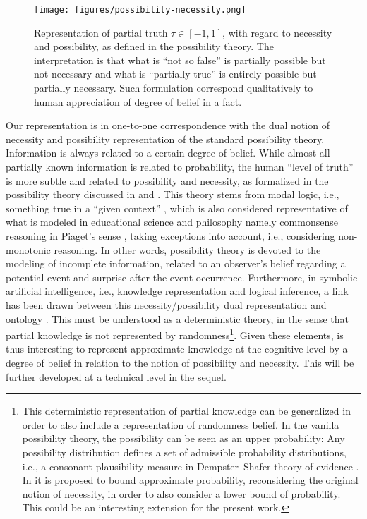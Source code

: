 \documentclass[sn-mathphys]{sn-jnl}
\begin{document}
\begin{figure}[htbp]
\centerline{\texttt{[image: figures/possibility-necessity.png]}}
\caption{Representation of partial truth $\tau \in [-1,1]$, with regard to necessity and possibility, as defined in the possibility theory. The interpretation is that what is ``not so false'' is partially possible but not necessary and what is ``partially true'' is entirely possible but partially necessary. Such formulation correspond qualitatively to human appreciation of degree of belief in a fact.}
\label{possibility-necessity}
\end{figure}

Our representation is in one-to-one correspondence with the dual notion of necessity and possibility representation of the standard possibility theory. Information is always related to a certain degree of belief. While almost all partially known information is related to probability, the human ``level of truth'' is more subtle and related to possibility and necessity, as formalized in the possibility theory discussed in \cite{denoeux_representations_2020} and \cite{denoeux_representations_2020-1}. This theory stems from modal logic, i.e., something true in a ``given context'' \cite{fischer_modal_2018}, which is also considered representative of what is modeled in educational science and philosophy \cite{rusawuk_possibility_2018} namely commonsense reasoning in Piaget's sense \cite{smith_development_1994}, taking exceptions into account, i.e., considering non-monotonic reasoning. In other words, possibility theory is devoted to the modeling of incomplete information, related to an observer's belief regarding a potential event and surprise after the event occurrence. Furthermore, in symbolic artificial intelligence, i.e., knowledge representation and logical inference, a link has been drawn between this necessity/possibility dual representation and ontology \cite{tettamanzi_possibilistic_2017}. This must be understood as a deterministic theory, in the sense that partial knowledge is not represented by randomness\footnote{This deterministic representation of partial knowledge can be generalized in order to also include a representation of randomness belief. In the vanilla possibility theory, the possibility can be seen as an upper probability: Any possibility distribution defines a set of admissible probability distributions, i.e., a consonant plausibility measure in Dempster–Shafer theory of evidence \cite{beynon_dempstershafer_2000}. In \cite{vallaeys_generaliser_2021,vieville_representation_2022} it is proposed to bound approximate probability, reconsidering the original notion of necessity, in order to also consider a lower bound of probability. This could be an interesting extension for the present work.}. Given these elements, is thus interesting to represent approximate knowledge at the cognitive level by a degree of belief in relation to the notion of possibility and necessity. This will be further developed at a technical level in the sequel.
\end{document}
